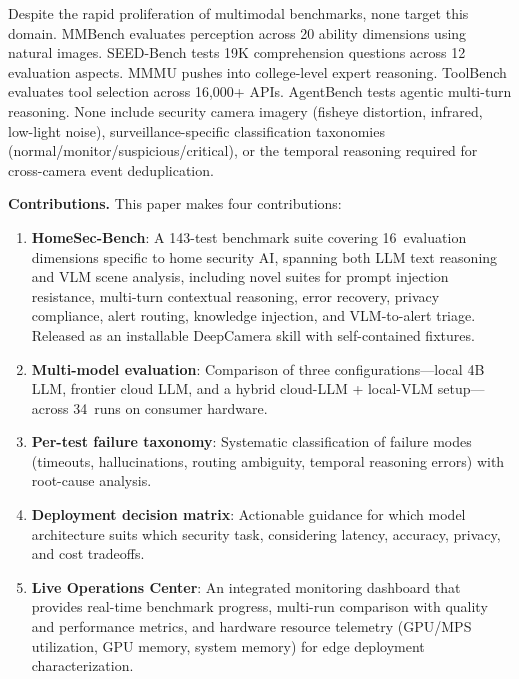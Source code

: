 \documentclass[conference]{IEEEtran}
\begin{document}
Despite the rapid proliferation of multimodal benchmarks, none target
this domain. MMBench \cite{liu2023mmbench} evaluates perception across
20 ability dimensions using natural images. SEED-Bench
\cite{li2023seedbench} tests 19K comprehension questions across 12
evaluation aspects. MMMU \cite{yue2024mmmu} pushes into
college-level expert reasoning. ToolBench \cite{qin2023toolllm} evaluates
tool selection across 16,000+ APIs. AgentBench \cite{liu2023agentbench}
tests agentic multi-turn reasoning. None include security camera imagery
(fisheye distortion, infrared, low-light noise), surveillance-specific
classification taxonomies (normal/monitor/suspicious/critical), or the
temporal reasoning required for cross-camera event deduplication.

\textbf{Contributions.} This paper makes four contributions:
\begin{enumerate}[nosep]
    \item \textbf{HomeSec-Bench}: A 143-test benchmark suite covering
    16~evaluation dimensions specific to home security AI, spanning
    both LLM text reasoning and VLM scene analysis, including novel
    suites for prompt injection resistance, multi-turn contextual
    reasoning, error recovery, privacy compliance, alert routing,
    knowledge injection, and VLM-to-alert triage. Released as an
    installable DeepCamera skill with self-contained fixtures.
    \item \textbf{Multi-model evaluation}: Comparison of three
    configurations---local 4B LLM, frontier cloud LLM, and a hybrid
    cloud-LLM + local-VLM setup---across 34~runs on consumer hardware.
    \item \textbf{Per-test failure taxonomy}: Systematic classification
    of failure modes (timeouts, hallucinations, routing ambiguity,
    temporal reasoning errors) with root-cause analysis.
    \item \textbf{Deployment decision matrix}: Actionable guidance for
    which model architecture suits which security task, considering
    latency, accuracy, privacy, and cost tradeoffs.
    \item \textbf{Live Operations Center}: An integrated monitoring
    dashboard that provides real-time benchmark progress, multi-run
    comparison with quality and performance metrics, and hardware
    resource telemetry (GPU/MPS utilization, GPU memory, system memory)
    for edge deployment characterization.
\end{enumerate}

\end{document}
